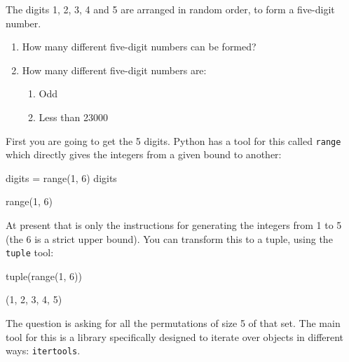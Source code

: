 The digits 1, 2, 3, 4 and 5 are arranged in random order, to form a five-digit number.
\begin{enumerate}

\item 

How many different five-digit numbers can be formed?

\item 

How many different five-digit numbers are:
\begin{enumerate}

\item 

Odd

\item 

Less than 23000

\end{enumerate}

\end{enumerate}



First you are going to get the 5 digits. Python has a tool for this called
\texttt{range} which directly gives the integers from a given bound to another:




\begin{pyin}
digits = range(1, 6)
digits
\end{pyin}





\begin{raw}
range(1, 6)
\end{raw}





At present that is only the instructions for generating the integers from 1 to 5
(the 6 is a strict upper bound). You can transform this to a tuple, using the
\texttt{tuple} tool:




\begin{pyin}
tuple(range(1, 6))
\end{pyin}





\begin{raw}
(1, 2, 3, 4, 5)
\end{raw}

The question is asking for all the permutations of size 5 of that set.
The main tool for this is a library specifically designed to iterate over
objects in different ways: \texttt{itertools}.

